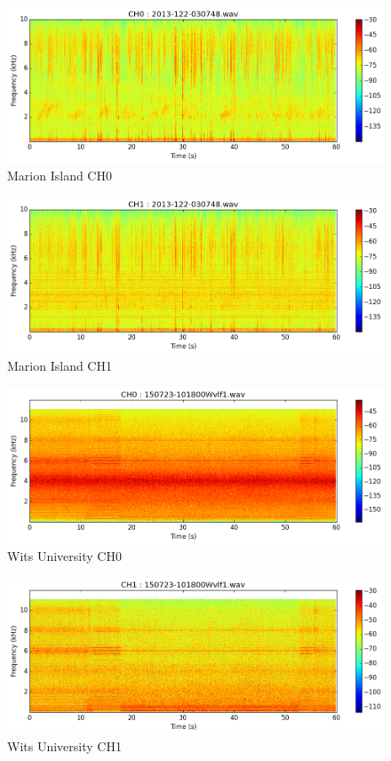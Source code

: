 \documentclass[a4paper,12pt]{article}
\begin{document}
\begin{figure}[h!]
	\centering
	\includegraphics[width=15cm]{Images/MarionCH0.png}
	\caption{Marion Island CH0}
	\label{fig:MARIONCH0}
\end{figure}

\begin{figure}[h!]
	\centering
	\includegraphics[width=15cm]{Images/MarionCH1.png}
	\caption{Marion Island CH1}
	\label{fig:MARIONCH1}
\end{figure}

\begin{figure}[h!]
	\centering
	\includegraphics[width=15cm]{Images/WitsCH0.png}
	\caption{Wits University CH0}
	\label{fig:WITSCH0}
\end{figure}

\begin{figure}[h!]
	\centering
	\includegraphics[width=15cm]{Images/WitsCH1.png}
	\caption{Wits University CH1}
	\label{fig:WITSCH1}
\end{figure}
\newpage
\end{document}
